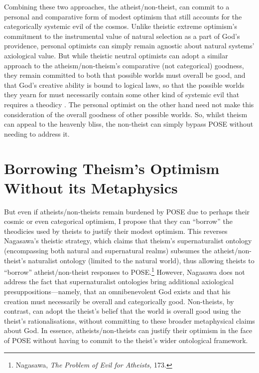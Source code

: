Combining these two approaches, the atheist/non-theist, can commit to a
personal and comparative form of modest optimism that still accounts for
the categorically systemic evil of the cosmos. Unlike theistic extreme
optimism's commitment to the instrumental value of natural selection as
a part of God's providence, personal optimists can simply remain
agnostic about natural systems' axiological value. But while theistic
neutral optimists can adopt a similar approach to the
atheism/non-theism's comparative (not categorical) goodness, they remain
committed to both that possible worlds must overall be good, and that
God's creative ability is bound to logical laws, so that the possible
worlds they yearn for must necessarily contain some other kind of
systemic evil that requires a theodicy . The personal optimist on the
other hand need not make this consideration of the overall goodness of
other possible worlds. So, whilst theism can appeal to the heavenly
bliss, the non-theist can simply bypass POSE without needing to address
it.

\section{Borrowing Theism's Optimism Without its Metaphysics}

But even if atheists/non-theists remain burdened by POSE due to perhaps
their cosmic or even categorical optimism, I propose that they can
``borrow'' the theodicies used by theists to justify their modest
optimism. This reverses Nagasawa's theistic strategy, which claims that
theism's supernaturalist ontology (encompassing both natural and
supernatural realms) subsumes the atheist/non-theist's naturalist
ontology (limited to the natural world), thus allowing theists to
``borrow'' atheist/non-theist responses to POSE.\footnote{Nagasawa,
  \emph{The Problem of Evil for Atheists,} 173.} However, Nagasawa does
not address the fact that supernaturalist ontologies bring additional
axiological presuppositions---namely, that an omnibenevolent God exists
and that his creation must necessarily be overall and categorically
good. Non-theists, by contrast, can adopt the theist's belief that the
world is overall good using the theist's rationalisations, without
committing to these broader metaphysical claims about God. In essence,
atheists/non-theists can justify their optimism in the face of POSE
without having to commit to the theist's wider ontological framework.

